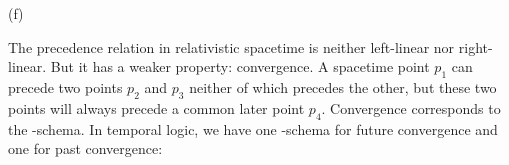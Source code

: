 \begin{solution}
\begin{sollist}
    \item[(f)] 
    \medskip
  \end{sollist}
\end{solution}


The precedence relation in relativistic spacetime is neither left-linear nor
right-linear. But it has a weaker property: convergence.
%
%
A spacetime point $p_1$ can precede two points $p_2$ and $p_3$ neither of which
precedes the other, but these two points will always precede a common later
point $p_4$. Convergence corresponds to the -schema. In temporal
logic, we have one -schema for future convergence and one for past
convergence:
%
\begin{principles}
\\
\end{principles}

